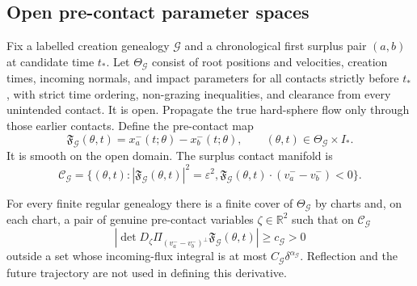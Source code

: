 \subsection{Open pre-contact parameter spaces}

Fix a labelled creation genealogy \(\mathcal G\) and a chronological first
surplus pair \((a,b)\) at candidate time \(t_*\).  Let \(\Theta_{\mathcal G}\)
consist of root positions and velocities, creation times, incoming normals, and
impact parameters for all contacts strictly before \(t_*\), with strict time
ordering, non-grazing inequalities, and clearance from every unintended
contact.  It is open.  Propagate the true hard-sphere flow only through those
earlier contacts.  Define the pre-contact map
\[
 \mathfrak F_{\mathcal G}(\theta,t)
 =x_a^-(t;\theta)-x_b^-(t;\theta),
 \qquad (\theta,t)\in\Theta_{\mathcal G}\times I_*.
\]
It is smooth on the open domain.  The surplus contact manifold is
\[
 \mathcal C_{\mathcal G}
 =\{(\theta,t):|\mathfrak F_{\mathcal G}(\theta,t)|^2
   =\varepsilon^2,
   \mathfrak F_{\mathcal G}(\theta,t)
    \cdot(v_a^--v_b^-)<0\}.
\]

\begin{lemma}
\label{lem:r16-b2-submersion}
For every finite regular genealogy there is a finite cover of
\(\Theta_{\mathcal G}\) by charts and, on each chart, a pair of genuine
pre-contact variables \(\zeta\in\mathbb R^2\) such that on
\(\mathcal C_{\mathcal G}\)
\[
 \left|\det D_\zeta
 \Pi_{(v_a^--v_b^-)^\perp}
 \mathfrak F_{\mathcal G}(\theta,t)\right|
 \ge c_{\mathcal G}>0
\]
outside a set whose incoming-flux integral is at most
\(C_{\mathcal G}\delta^{\alpha_{\mathcal G}}\).  Reflection and the future
trajectory are not used in defining this derivative.
\end{lemma}

